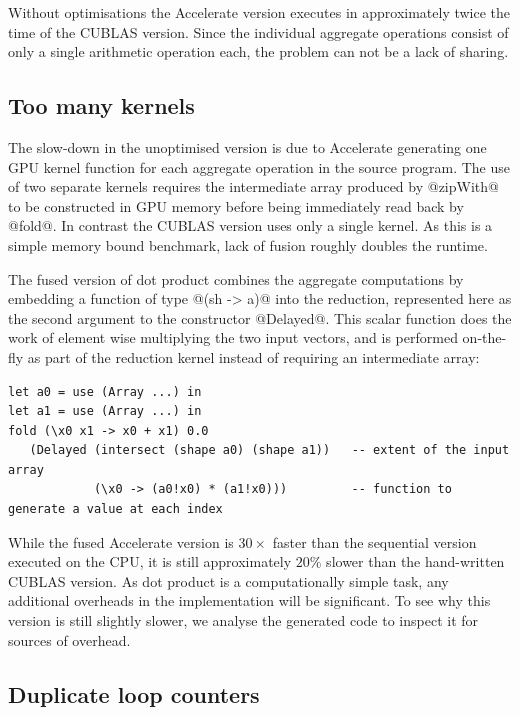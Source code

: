 Without optimisations the Accelerate version executes in approximately twice the
time of the CUBLAS version. Since the individual aggregate operations consist of
only a single arithmetic operation each, the problem can not be a lack of
sharing.


\subsection{Too many kernels}

The slow-down in the unoptimised version is due to Accelerate generating one GPU
kernel function for each aggregate operation in the source program. The use of
two separate kernels requires the intermediate array produced by @zipWith@
to be constructed in GPU memory before being immediately read back by
@fold@. In contrast the CUBLAS version uses only a single kernel. As this
is a simple memory bound benchmark, lack of fusion roughly doubles the runtime.

The fused version of dot product combines the aggregate computations by
embedding a function of type @(sh -> a)@ into the reduction, represented
here as the second argument to the constructor @Delayed@. This scalar
function does the work of element wise multiplying the two input vectors, and is
performed on-the-fly as part of the reduction kernel instead of requiring an
intermediate array:
%
\begin{lstlisting}[style=haskell]
let a0 = use (Array ...) in
let a1 = use (Array ...) in
fold (\x0 x1 -> x0 + x1) 0.0
   (Delayed (intersect (shape a0) (shape a1))   -- extent of the input array
            (\x0 -> (a0!x0) * (a1!x0)))         -- function to generate a value at each index
\end{lstlisting}

While the fused Accelerate version is $30\times$ faster than the sequential
version executed on the CPU, it is still approximately $20\%$ slower than the
hand-written CUBLAS version. As dot product is a computationally simple task,
any additional overheads in the implementation will be significant. To see why
this version is still slightly slower, we analyse the generated code to inspect
it for sources of overhead.


\subsection{Duplicate loop counters}

